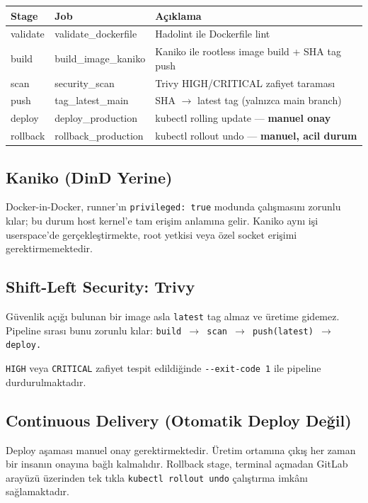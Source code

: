 \documentclass[12pt,a4paper]{article}
\begin{document}
\begin{center}
\begin{tabularx}{\textwidth}{llX}
\toprule
\textbf{Stage} & \textbf{Job} & \textbf{Açıklama} \\
\midrule
validate  & validate\_dockerfile  & Hadolint ile Dockerfile lint \\
build     & build\_image\_kaniko  & Kaniko ile rootless image build + SHA tag push \\
scan      & security\_scan        & Trivy HIGH/CRITICAL zafiyet taraması \\
push      & tag\_latest\_main     & SHA $\to$ latest tag (yalnızca main branch) \\
deploy    & deploy\_production    & kubectl rolling update — \textbf{manuel onay} \\
rollback  & rollback\_production  & kubectl rollout undo — \textbf{manuel, acil durum} \\
\bottomrule
\end{tabularx}
\end{center}

\subsection{Kaniko (DinD Yerine)}

Docker-in-Docker, runner'ın \texttt{privileged: true} modunda
çalışmasını zorunlu kılar; bu durum host kernel'e tam erişim anlamına
gelir. Kaniko aynı işi userspace'de gerçekleştirmekte, root yetkisi
veya özel socket erişimi gerektirmemektedir.

\subsection{Shift-Left Security: Trivy}

Güvenlik açığı bulunan bir image asla \texttt{latest} tag almaz ve
üretime gidemez. Pipeline sırası bunu zorunlu kılar:
\texttt{build $\to$ scan $\to$ push(latest) $\to$ deploy.}

\texttt{HIGH} veya \texttt{CRITICAL} zafiyet tespit edildiğinde
\texttt{-{}-exit-code 1} ile pipeline durdurulmaktadır.

\subsection{Continuous Delivery (Otomatik Deploy Değil)}

Deploy aşaması manuel onay gerektirmektedir. Üretim ortamına çıkış
her zaman bir insanın onayına bağlı kalmalıdır. Rollback stage,
terminal açmadan GitLab arayüzü üzerinden tek tıkla
\texttt{kubectl rollout undo} çalıştırma imkânı sağlamaktadır.
\end{document}
